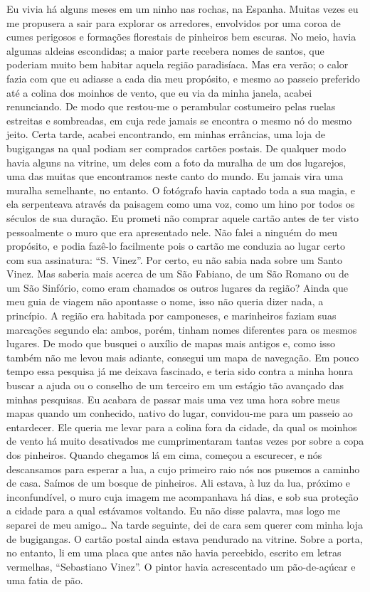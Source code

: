 Eu vivia há alguns meses em um ninho nas rochas, na Espanha. Muitas
vezes eu me propusera a sair para explorar os arredores, envolvidos por
uma coroa de cumes perigosos e formações florestais de pinheiros bem
escuras. No meio, havia algumas aldeias escondidas; a maior parte
recebera nomes de santos, que poderiam muito bem habitar aquela região
paradisíaca. Mas era verão; o calor fazia com que eu adiasse a cada dia
meu propósito, e mesmo ao passeio preferido até a colina dos moinhos de
vento, que eu via da minha janela, acabei renunciando. De modo que
restou-me o perambular costumeiro pelas ruelas estreitas e sombreadas,
em cuja rede jamais se encontra o mesmo nó do mesmo jeito. Certa tarde,
acabei encontrando, em minhas errâncias, uma loja de bugigangas na qual
podiam ser comprados cartões postais. De qualquer modo havia alguns na
vitrine, um deles com a foto da muralha de um dos lugarejos, uma das
muitas que encontramos neste canto do mundo. Eu jamais vira uma muralha
semelhante, no entanto. O fotógrafo havia captado toda a sua magia, e
ela serpenteava através da paisagem como uma voz, como um hino por todos
os séculos de sua duração. Eu prometi não comprar aquele cartão antes de
ter visto pessoalmente o muro que era apresentado nele. Não falei a
ninguém do meu propósito, e podia fazê-lo facilmente pois o cartão me
conduzia ao lugar certo com sua assinatura: ``S. Vinez''. Por certo, eu
não sabia nada sobre um Santo Vinez. Mas saberia mais acerca de um São
Fabiano, de um São Romano ou de um São Sinfório, como eram chamados os
outros lugares da região? Ainda que meu guia de viagem não apontasse o
nome, isso não queria dizer nada, a princípio. A região era habitada por
camponeses, e marinheiros faziam suas marcações segundo ela: ambos,
porém, tinham nomes diferentes para os mesmos lugares. De modo que
busquei o auxílio de mapas mais antigos e, como isso também não me levou
mais adiante, consegui um mapa de navegação. Em pouco tempo essa
pesquisa já me deixava fascinado, e teria sido contra a minha honra
buscar a ajuda ou o conselho de um terceiro em um estágio tão avançado
das minhas pesquisas. Eu acabara de passar mais uma vez uma hora sobre
meus mapas quando um conhecido, nativo do lugar, convidou-me para um
passeio ao entardecer. Ele queria me levar para a colina fora da cidade,
da qual os moinhos de vento há muito desativados me cumprimentaram
tantas vezes por sobre a copa dos pinheiros. Quando chegamos lá em cima,
começou a escurecer, e nós descansamos para esperar a lua, a cujo
primeiro raio nós nos pusemos a caminho de casa. Saímos de um bosque de
pinheiros. Ali estava, à luz da lua, próximo e inconfundível, o muro
cuja imagem me acompanhava há dias, e sob sua proteção a cidade para a
qual estávamos voltando. Eu não disse palavra, mas logo me separei de
meu amigo\ldots{} Na tarde seguinte, dei de cara sem querer com minha loja de
bugigangas. O cartão postal ainda estava pendurado na vitrine. Sobre a
porta, no entanto, li em uma placa que antes não havia percebido,
escrito em letras vermelhas, ``Sebastiano Vinez''. O pintor havia
acrescentado um pão-de-açúcar e uma fatia de pão.

